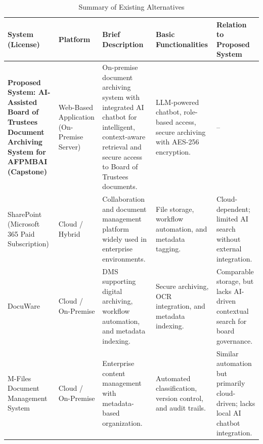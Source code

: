 
\begin{table}[H]
    \centering
    \caption{Summary of Existing Alternatives}
    \label{table:existing-alternatives-summary}
    
    \footnotesize 
    
    \renewcommand{\arraystretch}{1.1} 
    
    \setlength{\tabcolsep}{4pt} 

    \begin{tabularx}{\textwidth}{|p{2.5cm}|p{2.0cm}|L|L|L|}
        \hline
        \textbf{System (License)} & \textbf{Platform} & \textbf{Brief Description} & \textbf{Basic Functionalities} & \textbf{Relation to Proposed System} \\
        \hline\hline
        
        \textbf{Proposed System: AI-Assisted Board of Trustees Document Archiving System for AFPMBAI (Capstone)} & 
        Web-Based Application (On-Premise Server) & 
        On-premise document archiving system with integrated AI chatbot for intelligent, context-aware retrieval and secure access to Board of Trustees documents. & 
        LLM-powered chatbot, role-based access, secure archiving with AES-256 encryption. & 
        -- \\
        \hline
        
        SharePoint (Microsoft 365 Paid Subscription) & 
        Cloud / Hybrid & 
        Collaboration and document management platform widely used in enterprise environments. & 
        File storage, workflow automation, and metadata tagging. & 
        Cloud-dependent; limited AI search without external integration. \\
        \hline
        
        DocuWare & 
        Cloud / On-Premise & 
        DMS supporting digital archiving, workflow automation, and metadata indexing. & 
        Secure archiving, OCR integration, and metadata indexing. & 
        Comparable storage, but lacks AI-driven contextual search for board governance. \\
        \hline
        
        M-Files Document Management System& 
        Cloud / On-Premise & 
        Enterprise content management with metadata-based organization. & 
        Automated classification, version control, and audit trails. & 
        Similar automation but primarily cloud-driven; lacks local AI chatbot integration. \\
        \hline
    \end{tabularx}
\end{table}


